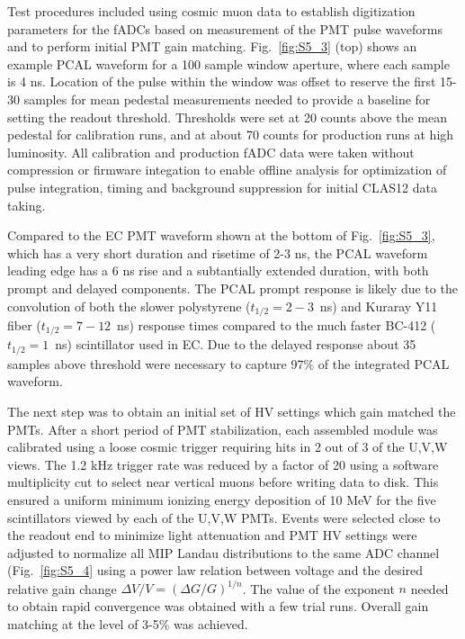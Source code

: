 Test procedures included using cosmic muon data to establish digitization parameters for the fADCs based on measurement of the PMT pulse waveforms and to perform initial PMT gain matching.  Fig.~\ref{fig:S5_3} (top) shows an example PCAL waveform for a 100 sample window aperture, where each sample is 4 ns.  Location of the pulse within the window was offset to reserve the first 15-30 samples for mean pedestal measurements needed to provide a baseline for setting the readout threshold.  Thresholds were set at 20 counts above the mean pedestal for calibration runs, and at about 70 counts for production runs at high luminosity.  All calibration and production fADC data were taken without compression or firmware integation to enable offline analysis for optimization of pulse integration, timing and background suppression for initial CLAS12 data taking.

Compared to the EC PMT waveform shown at the bottom of Fig.~\ref{fig:S5_3}, which has a very short duration and risetime of 2-3 ns, the PCAL waveform leading edge has a 6 ns rise and a subtantially extended duration, with both prompt and delayed components.  The PCAL prompt response is likely due to the convolution of both the slower polystyrene ($t_{1/2}=2-3$~ns) and Kuraray Y11 fiber ($t_{1/2}=7-12$~ns) response times compared to the much faster BC-412 ($t_{1/2}=1$~ns) scintillator used in EC.  Due to the delayed response about 35 samples above threshold were necessary to capture 97$\%$ of the integrated PCAL waveform.  

The next step was to obtain an initial set of HV settings which gain matched the PMTs.  After a short period of PMT stabilization, each assembled module was calibrated using a loose cosmic trigger requiring hits in 2 out of 3 of the U,V,W views.  The 1.2 kHz trigger rate was reduced by a factor of 20 using a software multiplicity cut to select near vertical muons before writing data to disk.  This ensured a uniform minimum ionizing energy deposition of 10 MeV for the five scintillators viewed by each of the U,V,W PMTs. Events were selected close to the readout end to minimize light attenuation and PMT HV settings were adjusted to normalize all MIP Landau distributions to the same ADC channel (Fig.~\ref{fig:S5_4} using a power law relation between voltage and the desired relative gain change $\Delta V/V = (\Delta G/G)^{1/n}$.  The value of the exponent $n$ needed to obtain rapid convergence was obtained with a few trial runs.  Overall gain matching at the level of 3-5$\%$ was achieved.

